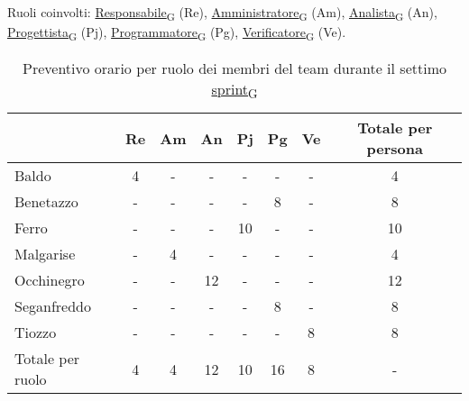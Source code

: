 \newpage
{}
Ruoli coinvolti: \href{https://7last.github.io/docs/pb/documentazione-interna/glossario\#responsabile}{Responsabile\textsubscript{G}} (Re), \href{https://7last.github.io/docs/pb/documentazione-interna/glossario\#amministratore}{Amministratore\textsubscript{G}} (Am), \href{https://7last.github.io/docs/pb/documentazione-interna/glossario\#analista}{Analista\textsubscript{G}} (An), \href{https://7last.github.io/docs/pb/documentazione-interna/glossario\#progettista}{Progettista\textsubscript{G}} (Pj), \href{https://7last.github.io/docs/pb/documentazione-interna/glossario\#programmatore}{Programmatore\textsubscript{G}} (Pg), \href{https://7last.github.io/docs/pb/documentazione-interna/glossario\#verificatore}{Verificatore\textsubscript{G}} (Ve).
\begin{table}[!h]
	\centering
	\begin{tabular}{ | l | c | c | c | c | c | c | c | }
		\hline
		\textbf{} & \textbf{Re} & \textbf{Am} &\textbf{An} & \textbf{Pj} & \textbf{Pg} & \textbf{Ve} & \textbf{Totale per persona} \\
		\hline
		Baldo            &  4   &  -   &  -   &  -   &  -   &  -   &  4   \\
		Benetazzo        &  -   &  -   &  -   &  -   &  8   &  -   &  8   \\
		Ferro            &  -   &  -   &  -   & 10   &  -   &  -   & 10   \\
		Malgarise        &  -   &  4   &  -   &  -   &  -   &  -   &  4   \\
		Occhinegro       &  -   &  -   & 12   &  -   &  -   &  -   & 12   \\
		Seganfreddo      &  -   &  -   &  -   &  -   &  8   &  -   &  8   \\
		Tiozzo           &  -   &  -   &  -   &  -   &  -   &  8   &  8   \\
		\hline
		Totale per ruolo &  4   &  4   & 12   & 10   & 16   &  8   &  -   \\
		\hline
	\end{tabular}
	\caption{Preventivo orario per ruolo dei membri del team durante il settimo \href{https://7last.github.io/docs/pb/documentazione-interna/glossario\#sprint}{sprint\textsubscript{G}}}

\end{table}

